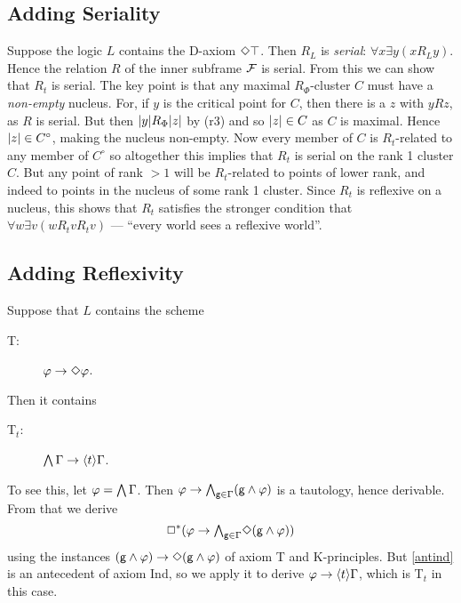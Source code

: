 \subsection{Adding Seriality} 

Suppose the logic $L$ contains the D-axiom $\Diamond\top$. Then $R_L$  is \emph{serial}: $\forall x\exists y(xR_Ly)$.  Hence the relation $R$ of the inner subframe $\mathcal{F}$ is serial.
From this we can show that $R_t$ is serial. The key point is that any maximal $R_\Phi$-cluster $C$ must have a \emph{non-empty} nucleus. For, if $y$ is the critical point for $C$, then there is a $z$ with $yRz$, as $R$ is serial. But then $|y|R_\Phi|z|$ by (r3) and so $|z|\in C$ as $C$ is maximal. Hence  $|z|\in C^\circ$, making the nucleus non-empty. Now every member of $C$ is $R_t$-related to any member of $C^\circ$ so altogether this implies that $R_t$ is serial on the rank 1 cluster $C$. But any point of rank $>1$ will be $R_t$-related to points  of lower rank, and indeed to points in the nucleus of some rank 1 cluster. Since $R_t$ is reflexive on a nucleus,  this shows that $R_t$ satisfies the stronger condition that  $\forall w\exists v(wR_t vR_t v)$ --- ``every world sees a reflexive world''.


\subsection{Adding Reflexivity} 

Suppose that $L$ contains the scheme
\begin{description}
\item[T:]
$\varphi\to\Diamond\varphi$.
\end{description}
Then it  contains
\begin{description}
\item[T$_t$: ] 
$\bigwedge\Gamma\to\langle t\rangle\Gamma$.
\end{description}
To see this, let $\varphi=\bigwedge\Gamma$. Then
$
\varphi\to \bigwedge_{{\sf g}\in\Gamma}({\sf g}\land\varphi)
$
is a tautology, hence derivable. From that we derive
\begin{equation} \label{antind}
\Box^*(\ph\to{\textstyle \bigwedge}_{\g\in\G}\Dim(\g\land\ph))
\end{equation}
using  the instances $({\sf g}\land\varphi)\to\Diamond({\sf g}\land\varphi)$ of axiom T and K-principles. But \eqref{antind} is an antecedent of axiom Ind, so we apply it  to derive  $\varphi\to\langle t\rangle\Gamma$, which is T$_t$ in this case.


